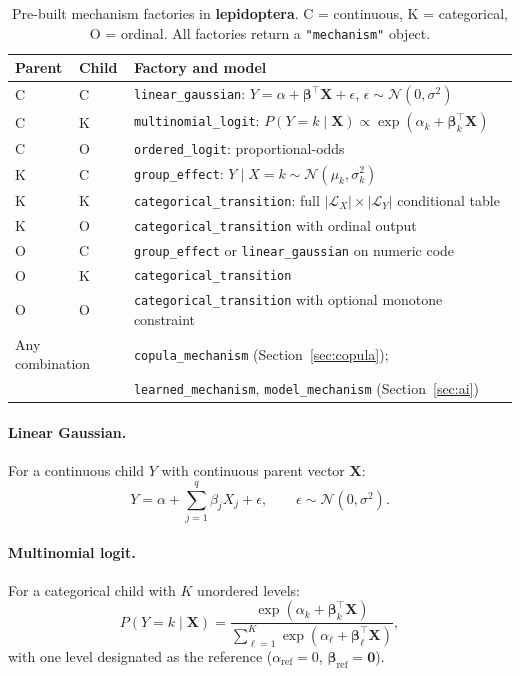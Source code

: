 \documentclass[12pt,a4paper]{article}
\newcommand{\pkg}[1]{\textbf{#1}}
\newcommand{\code}[1]{\texttt{#1}}
\newcommand{\class}[1]{\mbox{\texttt{"#1"}}}
\begin{document}
\begin{table}[ht]
\centering
\caption{Pre-built mechanism factories in \pkg{lepidoptera}. C = continuous,
K = categorical, O = ordinal. All factories return a \class{mechanism} object.}
\label{tab:mechanisms}
\small
\begin{tabular}{lll}
\toprule
Parent & Child & Factory and model \\
\midrule
C & C & \code{linear\_gaussian}: $Y = \alpha + \boldsymbol\beta^\top\mathbf{X}+\epsilon$,
        $\epsilon\sim\mathcal{N}(0,\sigma^2)$ \\
C & K & \code{multinomial\_logit}: $P(Y\!=\!k\mid\mathbf{X})\propto\exp(\alpha_k+\boldsymbol\beta_k^\top\mathbf{X})$ \\
C & O & \code{ordered\_logit}: proportional-odds \citep{mccullagh1980regression} \\
K & C & \code{group\_effect}: $Y\mid X\!=\!k\sim\mathcal{N}(\mu_k,\sigma_k^2)$ \\
K & K & \code{categorical\_transition}: full $|\mathcal{L}_X|\times|\mathcal{L}_Y|$ conditional table \\
K & O & \code{categorical\_transition} with ordinal output \\
O & C & \code{group\_effect} or \code{linear\_gaussian} on numeric code \\
O & K & \code{categorical\_transition} \\
O & O & \code{categorical\_transition} with optional monotone constraint \\
\midrule
\multicolumn{2}{l}{Any combination} & \code{copula\_mechanism} (Section~\ref{sec:copula}); \\
                                    &  & \code{learned\_mechanism}, \code{model\_mechanism} (Section~\ref{sec:ai}) \\
\bottomrule
\end{tabular}
\end{table}

\paragraph{Linear Gaussian.}
For a continuous child $Y$ with continuous parent vector $\mathbf{X}$:
\begin{equation}
  Y = \alpha + \sum_{j=1}^q \beta_j X_j + \epsilon, \qquad \epsilon\sim\mathcal{N}(0,\sigma^2).
  \label{eq:linear_gaussian}
\end{equation}

\paragraph{Multinomial logit.}
For a categorical child with $K$ unordered levels:
\begin{equation}
  P(Y = k \mid \mathbf{X}) = \frac{\exp(\alpha_k + \boldsymbol\beta_k^\top\mathbf{X})}
  {\sum_{\ell=1}^K \exp(\alpha_\ell + \boldsymbol\beta_\ell^\top\mathbf{X})},
  \label{eq:multinomial}
\end{equation}
with one level designated as the reference ($\alpha_{\mathrm{ref}}=0$,
$\boldsymbol\beta_{\mathrm{ref}}=\mathbf{0}$).
\end{document}
